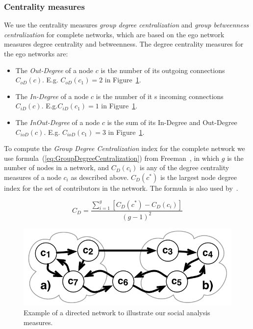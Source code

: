 \subsubsection{Centrality measures}
We use the centrality measures \emph{group degree centralization} and
\emph{group betweenness centralization} for complete networks, which are based on
the ego network measures degree centrality and betweenness. The degree
centrality measures for the ego networks are:

\begin{itemize}
  \item The \emph{Out-Degree} of a node $c$ is the
  number of its outgoing connections $C_{oD}(c)$. E.g. $C_{oD}(c_1)=2$ in 
  Figure~\ref{fig:CentralityExample}.
  
  \item The \emph{In-Degree} of a node $c$ is the
  number of it s incoming connections $C_{iD}(c)$. E.g.$C_{iD}(c_1)=1$ 
  in Figure~\ref{fig:CentralityExample}.
  
  \item The \emph{InOut-Degree} of a node $c$ is the sum of its In-Degree and
  Out-Degree $C_{ioD}(c)$. E.g. $C_{ioD}(c_1)=3$
  in Figure~\ref{fig:CentralityExample}.
\end{itemize}

To compute the \emph{Group Degree Centralization} index for the complete network
we use formula~(\ref{eq:GroupDegreeCentralization}) from
Freeman~\cite{Freeman:1979rl}, in which $g$ is the number of nodes in a network,
and $C_D(c_i)$ is any of the degree centrality measures of a node $c_i$ as
described above. $C_D(c^*)$ is the largest node degree index for the set of
contributors in the network. The formula is also used
by~\cite{Gloor:2003cikm,hinds:cscw:2006}.

\begin{equation}
\displaystyle C_D =  \frac{\sum_{i=1}^g[C_D(c^*) - C_D(c_i)]}{(g-1)^2}
\label{eq:GroupDegreeCentralization}
\end{equation}

\begin{figure}[t]
\begin{center}
\includegraphics[width=.6\columnwidth]{figures/CentralityExample}
\vspace{-10pt}
\caption{Example of a directed network to illustrate our social
analysis measures.}
\label{fig:CentralityExample}
\end{center}
\end{figure}

